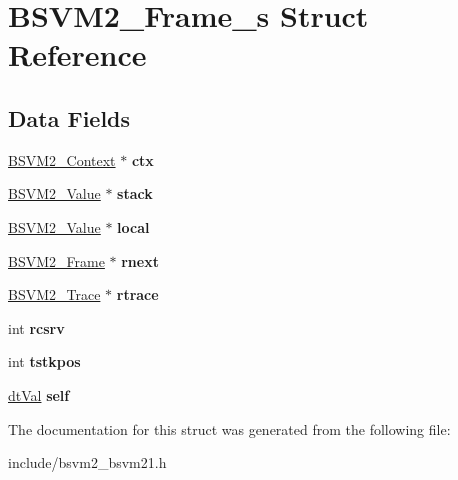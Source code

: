 \hypertarget{structBSVM2__Frame__s}{\section{B\-S\-V\-M2\-\_\-\-Frame\-\_\-s Struct Reference}
\label{structBSVM2__Frame__s}
}
\subsection*{Data Fields}
\begin{DoxyCompactItemize}
\item 
\hypertarget{structBSVM2__Frame__s_aa84c7031a3d3b4295d13ed47e1cc0282}{\hyperlink{structBSVM2__Context__s}{B\-S\-V\-M2\-\_\-\-Context} $\ast$ {\bfseries ctx}}\label{structBSVM2__Frame__s_aa84c7031a3d3b4295d13ed47e1cc0282}

\item 
\hypertarget{structBSVM2__Frame__s_ab46b57fe41ce36a603c50eae91d5567f}{\hyperlink{unionBSVM2__Value__u}{B\-S\-V\-M2\-\_\-\-Value} $\ast$ {\bfseries stack}}\label{structBSVM2__Frame__s_ab46b57fe41ce36a603c50eae91d5567f}

\item 
\hypertarget{structBSVM2__Frame__s_af92e86c8140a33f7352b219a2d516711}{\hyperlink{unionBSVM2__Value__u}{B\-S\-V\-M2\-\_\-\-Value} $\ast$ {\bfseries local}}\label{structBSVM2__Frame__s_af92e86c8140a33f7352b219a2d516711}

\item 
\hypertarget{structBSVM2__Frame__s_acba5529808de2e95c78cd7a4a71cb122}{\hyperlink{structBSVM2__Frame__s}{B\-S\-V\-M2\-\_\-\-Frame} $\ast$ {\bfseries rnext}}\label{structBSVM2__Frame__s_acba5529808de2e95c78cd7a4a71cb122}

\item 
\hypertarget{structBSVM2__Frame__s_accce470aaffcbc999d05c788c8017064}{\hyperlink{structBSVM2__Trace__s}{B\-S\-V\-M2\-\_\-\-Trace} $\ast$ {\bfseries rtrace}}\label{structBSVM2__Frame__s_accce470aaffcbc999d05c788c8017064}

\item 
\hypertarget{structBSVM2__Frame__s_a40ce72e4953c7b7f31386896f06dd972}{int {\bfseries rcsrv}}\label{structBSVM2__Frame__s_a40ce72e4953c7b7f31386896f06dd972}

\item 
\hypertarget{structBSVM2__Frame__s_a121548be19bd30f43b53ad97a91d8fd6}{int {\bfseries tstkpos}}\label{structBSVM2__Frame__s_a121548be19bd30f43b53ad97a91d8fd6}

\item 
\hypertarget{structBSVM2__Frame__s_a5cc45da402c6fb5b25c6a39e7ddf9116}{\hyperlink{unionBGBDT__TagValue__s}{dt\-Val} {\bfseries self}}\label{structBSVM2__Frame__s_a5cc45da402c6fb5b25c6a39e7ddf9116}

\end{DoxyCompactItemize}


The documentation for this struct was generated from the following file\-:\begin{DoxyCompactItemize}
\item 
include/bsvm2\-\_\-bsvm21.\-h\end{DoxyCompactItemize}
